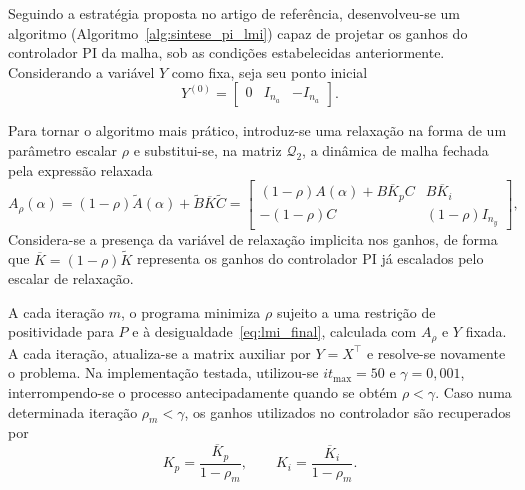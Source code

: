 Seguindo a estratégia proposta no artigo de referência, desenvolveu-se um algoritmo (Algoritmo~\ref{alg:sintese_pi_lmi}) capaz de projetar os ganhos do controlador PI da malha, sob as condições estabelecidas anteriormente. Considerando a variável $Y$ como fixa, seja seu ponto inicial
\begin{equation}
 Y^{(0)}=\begin{bmatrix}0&I_{n_a}&-I_{n_a}\end{bmatrix}.
 \label{eq:lmi_y0}
\end{equation}

\noindent
Para tornar o algoritmo mais prático, introduz-se uma relaxação na forma de um parâmetro escalar $\rho$ e substitui-se, na matriz $\mathcal Q_2$, a dinâmica de malha fechada pela expressão relaxada
\begin{equation}
 A_\rho(\alpha)= (1-\rho)\widetilde A(\alpha)+\widetilde B\overline K\widetilde C
 =\begin{bmatrix}
 (1-\rho)A(\alpha)+B\overline K_pC&B\overline K_i\\
 -(1-\rho)C&(1-\rho)I_{n_y}
 \end{bmatrix},
 \label{eq:matriz_rho}
\end{equation}
Considera-se a presença da variável de relaxação implicita  nos ganhos, de forma que $\overline K = (1-\rho)\widetilde K $ representa os ganhos do controlador PI já escalados pelo escalar de relaxação.

A cada iteração $m$, o programa minimiza $\rho$ sujeito a uma restrição de positividade para $P$ e à desigualdade~\eqref{eq:lmi_final}, calculada com $A_\rho$ e $Y$ fixada. A cada iteração, atualiza-se a matrix auxiliar por $Y=X^\top$ e resolve-se novamente o problema. Na implementação testada, utilizou-se $it_{\max}=50$ e $\gamma = 0,001$, interrompendo-se o processo antecipadamente quando se obtém $\rho<\gamma$. Caso numa determinada iteração $\rho_m<\gamma$, os ganhos utilizados no controlador são recuperados por
\begin{equation}
 \boxed{K_p=\frac{\overline K_p}{1-\rho_m},\qquad
 K_i=\frac{\overline K_i}{1-\rho_m}.}
 \label{eq:normalizacao_ganhos}
\end{equation}


